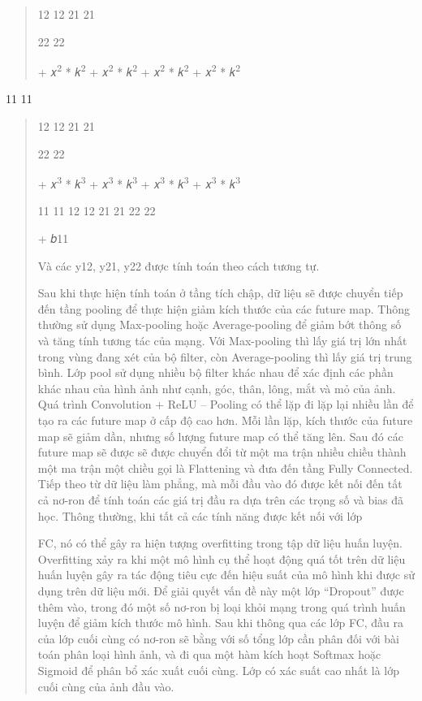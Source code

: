 \documentclass[
]{article}
\begin{document}
\begin{quote}
12 12 21 21

22 22

+ 𝑥\textsuperscript{2} * 𝑘\textsuperscript{2} + 𝑥\textsuperscript{2} *
𝑘\textsuperscript{2} + 𝑥\textsuperscript{2} * 𝑘\textsuperscript{2} +
𝑥\textsuperscript{2} * 𝑘\textsuperscript{2}
\end{quote}

11 11

\begin{quote}
12 12 21 21

22 22

+ 𝑥\textsuperscript{3} * 𝑘\textsuperscript{3} + 𝑥\textsuperscript{3} *
𝑘\textsuperscript{3} + 𝑥\textsuperscript{3} * 𝑘\textsuperscript{3} +
𝑥\textsuperscript{3} * 𝑘\textsuperscript{3}

11 11 12 12 21 21 22 22

+ 𝑏11

Và các y12, y21, y22 được tính toán theo cách tương tự.

Sau khi thực hiện tính toán ở tầng tích chập, dữ liệu sẽ được chuyển
tiếp đến tầng pooling để thực hiện giảm kích thước của các future map.
Thông thường sử dụng Max-pooling hoặc Average-pooling để giảm bớt thông
số và tăng tính tương tác của mạng. Với Max-pooling thì lấy giá trị lớn
nhất trong vùng đang xét của bộ filter, còn Average-pooling thì lấy giá
trị trung bình. Lớp pool sử dụng nhiều bộ filter khác nhau để xác định
các phần khác nhau của hình ảnh như cạnh, góc, thân, lông, mắt và mỏ của
ảnh. Quá trình Convolution + ReLU -- Pooling có thể lặp đi lặp lại nhiều
lần để tạo ra các future map ở cấp độ cao hơn. Mỗi lần lặp, kích thước
của future map sẽ giảm dần, nhưng số lượng future map có thể tăng lên.
Sau đó các future map sẽ được sẽ được chuyển đổi từ một ma trận nhiều
chiều thành một ma trận một chiều gọi là Flattening và đưa đến tầng
Fully Connected. Tiếp theo từ dữ liệu làm phẳng, mà mỗi đầu vào đó được
kết nối đến tất cả nơ-ron để tính toán các giá trị đầu ra dựa trên các
trọng số và bias đã học. Thông thường, khi tất cả các tính năng được kết
nối với lớp

FC, nó có thể gây ra hiện tượng overfitting trong tập dữ liệu huấn
luyện. Overfitting xảy ra khi một mô hình cụ thể hoạt động quá tốt trên
dữ liệu huấn luyện gây ra tác động tiêu cực đến hiệu suất của mô hình
khi được sử dụng trên dữ liệu mới. Để giải quyết vấn đề này một lớp
``Dropout'' được thêm vào, trong đó một số nơ-ron bị loại khỏi mạng
trong quá trình huấn luyện để giảm kích thước mô hình. Sau khi thông qua
các lớp FC, đầu ra của lớp cuối cùng có nơ-ron sẽ bằng với số tổng lớp
cần phân đối với bài toán phân loại hình ảnh, và đi qua một hàm kích
hoạt Softmax hoặc Sigmoid để phân bổ xác xuất cuối cùng. Lớp có xác suất
cao nhất là lớp cuối cùng của ảnh đầu vào.
\end{quote}
\end{document}
